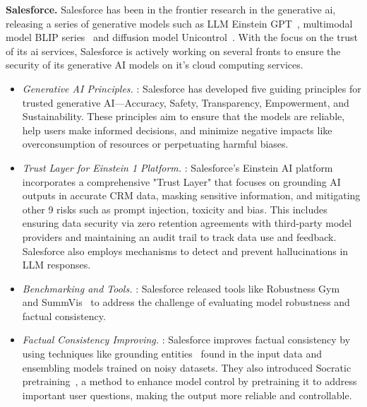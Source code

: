 \textbf{Salesforce.} Salesforce has been in the frontier research in the generative ai, releasing a series of generative models such as LLM Einstein GPT~\cite{salesforceeinstein}, multimodal model BLIP series~\cite{li2022blip,li2023blip,xue2024xgen} and diffusion model Unicontrol~\cite{li2024blip,qin2023unicontrol}. With the focus on the trust of its ai services, Salesforce is actively working on several fronts to ensure the security of its generative AI models on it's cloud computing services.
\begin{itemize}[nolistsep, leftmargin=15pt]
    \item[] \textcolor[HTML]{219ddc}{\largedot} {\textit{Generative AI Principles.}} \cite{salesforceprinciples}: Salesforce has developed five guiding principles for trusted generative AI—Accuracy, Safety, Transparency, Empowerment, and Sustainability. These principles aim to ensure that the models are reliable, help users make informed decisions, and minimize negative impacts like overconsumption of resources or perpetuating harmful biases.
    \item[] \textcolor[HTML]{219ddc}{\largedot} {\textit{Trust Layer for Einstein 1 Platform.}} \cite{salesforcetrustlayer}: Salesforce's Einstein AI platform incorporates a comprehensive "Trust Layer" that focuses on grounding AI outputs in accurate CRM data, masking sensitive information, and mitigating other 9 risks such as prompt injection, toxicity and bias. This includes ensuring data security via zero retention agreements with third-party model providers and maintaining an audit trail to track data use and feedback. Salesforce also employs mechanisms to detect and prevent hallucinations in LLM responses.
    \item[] \textcolor[HTML]{219ddc}{\largedot} {\textit{Benchmarking and Tools.}} \cite{goel2021robustness,vig2021summvis}: Salesforce released tools like Robustness Gym~\cite{goel2021robustness} and SummVis~\cite{vig2021summvis} to address the challenge of evaluating model robustness and factual consistency.
     \item[] \textcolor[HTML]{219ddc}{\largedot} {\textit{Factual Consistency Improving.}} \cite{salesforcetrustedNLG,zhang2022improving,pagnoni2022socratic}: Salesforce improves factual consistency by using techniques like grounding entities~\cite{zhang2022improving} found in the input data and ensembling models trained on noisy datasets. They also introduced Socratic pretraining~\cite{pagnoni2022socratic}, a method to enhance model control by pretraining it to address important user questions, making the output more reliable and controllable.
\end{itemize}

